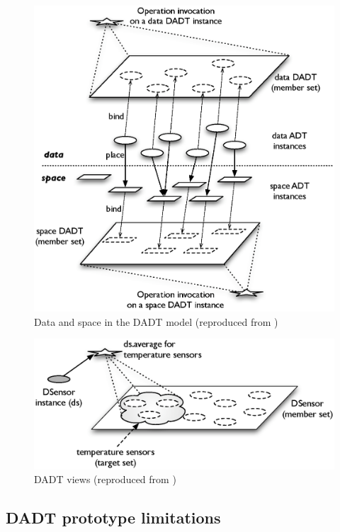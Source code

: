 \begin{figure}
\centering
\label{Fig:DADTs}
\includegraphics[scale=0.50]{img/DADTs.eps} \caption[Data and space in the DADT 
model]{Data and space in the DADT model (reproduced from 
\cite{migliavacca_DADT:2006})}
\end{figure}

\begin{figure}
\centering
\label{Fig:DADT_Views}
\includegraphics[scale=0.50]{img/DADT_Views.eps} \caption[DADT views]{DADT views
(reproduced from 
\cite{migliavacca_DADT:2006})}
\end{figure}

\subsection {DADT prototype limitations}

